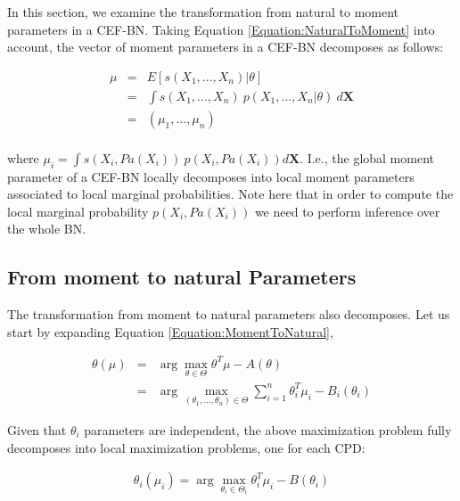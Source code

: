 \documentclass[11pt, oneside]{article}   	%
\newcommand{\bm}{\mathbf}
\numberwithin{figure}{section}
\numberwithin{equation}{section}
\numberwithin{table}{section}
\newcommand{\e}[1]{E\left[ #1 \right]}
\theoremstyle{definition}
\begin{document}
In this section, we examine the transformation from natural to moment parameters in a CEF-BN. Taking Equation \ref{Equation:NaturalToMoment} into account, the vector of moment parameters in a CEF-BN decomposes as follows:

\begin{equation}
\begin{array}{lll}
\mu & = & \e{s(X_1,\ldots, X_n)|\theta} \\
&=& \int s(X_1,\ldots, X_n)~p(X_1,\ldots, X_n|\theta)~d\bm X\\
&=& (\mu_1,\ldots,\mu_n) \\
\end{array}
\end{equation}

\noindent where $\mu_i= \int s(X_i,Pa(X_i))~p(X_i,Pa(X_i))d\bm X$. I.e., the global moment parameter of a CEF-BN locally decomposes into local moment parameters associated to local marginal probabilities. Note here that in order to compute the local marginal probability $p(X_i,Pa(X_i))$ we need to perform inference over the whole BN.

\subsection{From moment to natural Parameters} \label{Section:CEFBN:MomentToNatural}

The transformation from moment to natural parameters also decomposes. Let us start by expanding Equation \ref{Equation:MomentToNatural}, 

\begin{eqnarray}
\label{Equation:CEFBN_MomentToNatural}
\theta(\mu) &=& \arg\max_{\theta\in\Theta} \theta^T\mu
-A(\theta)\nonumber \\
&=& \arg\max_{(\theta_1,\ldots, \theta_n) \in\Theta} \sum_{i=1}^n \theta_i^T \mu_i - B_i(\theta_i) 
\end{eqnarray}

Given that $\theta_i$ parameters are independent, the above maximization problem fully decomposes into local maximization problems, one for each CPD:  

\begin{eqnarray}
\label{Equation:CEFBN_MomentToNaturalLocal}
\theta_i(\mu_i) = \arg\max_{\theta_i\in\Theta_i} \theta_i^T\mu_i - B(\theta_i)
\end{eqnarray}
\end{document}

